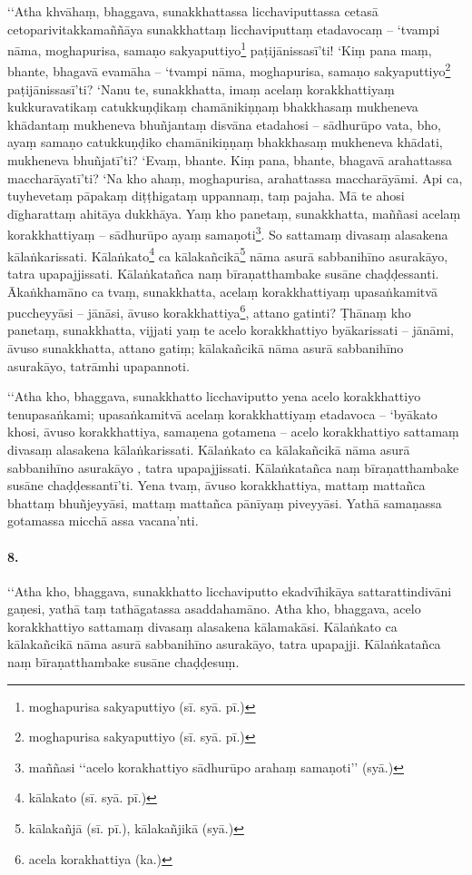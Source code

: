 ‘‘Atha khvāhaṃ, bhaggava, sunakkhattassa licchaviputtassa cetasā cetoparivitakkamaññāya sunakkhattaṃ licchaviputtaṃ etadavocaṃ – ‘tvampi nāma, moghapurisa, samaṇo sakyaputtiyo\footnote{moghapurisa sakyaputtiyo (sī. syā. pī.)} paṭijānissasī’ti! ‘Kiṃ pana maṃ, bhante, bhagavā evamāha – ‘tvampi nāma, moghapurisa, samaṇo sakyaputtiyo\footnote{moghapurisa sakyaputtiyo (sī. syā. pī.)} paṭijānissasī’ti? ‘Nanu te, sunakkhatta, imaṃ acelaṃ korakkhattiyaṃ kukkuravatikaṃ catukkuṇḍikaṃ chamānikiṇṇaṃ bhakkhasaṃ mukheneva khādantaṃ mukheneva bhuñjantaṃ disvāna etadahosi – sādhurūpo vata, bho, ayaṃ samaṇo catukkuṇḍiko chamānikiṇṇaṃ bhakkhasaṃ mukheneva khādati, mukheneva bhuñjatī’ti? ‘Evaṃ, bhante. Kiṃ pana, bhante, bhagavā arahattassa maccharāyatī’ti? ‘Na kho ahaṃ, moghapurisa, arahattassa maccharāyāmi. Api ca, tuyhevetaṃ pāpakaṃ diṭṭhigataṃ uppannaṃ, taṃ pajaha. Mā te ahosi dīgharattaṃ ahitāya dukkhāya. Yaṃ kho panetaṃ, sunakkhatta, maññasi acelaṃ korakkhattiyaṃ – sādhurūpo ayaṃ samaṇoti\footnote{maññasi ‘‘acelo korakhattiyo sādhurūpo arahaṃ samaṇoti’’ (syā.)}. So sattamaṃ divasaṃ alasakena kālaṅkarissati. Kālaṅkato\footnote{kālakato (sī. syā. pī.)} ca kālakañcikā\footnote{kālakañjā (sī. pī.), kālakañjikā (syā.)} nāma asurā sabbanihīno asurakāyo, tatra upapajjissati. Kālaṅkatañca naṃ bīraṇatthambake susāne chaḍḍessanti. Ākaṅkhamāno ca tvaṃ, sunakkhatta, acelaṃ korakkhattiyaṃ upasaṅkamitvā puccheyyāsi – jānāsi, āvuso korakkhattiya\footnote{acela korakhattiya (ka.)}, attano gatinti? Ṭhānaṃ kho panetaṃ, sunakkhatta, vijjati yaṃ te acelo korakkhattiyo byākarissati – jānāmi, āvuso sunakkhatta, attano gatiṃ; kālakañcikā nāma asurā sabbanihīno asurakāyo, tatrāmhi upapannoti.

‘‘Atha kho, bhaggava, sunakkhatto licchaviputto yena acelo korakkhattiyo tenupasaṅkami; upasaṅkamitvā acelaṃ korakkhattiyaṃ etadavoca – ‘byākato khosi, āvuso korakkhattiya, samaṇena gotamena – acelo korakkhattiyo sattamaṃ divasaṃ alasakena kālaṅkarissati. Kālaṅkato ca kālakañcikā nāma asurā sabbanihīno asurakāyo , tatra upapajjissati. Kālaṅkatañca naṃ bīraṇatthambake susāne chaḍḍessantī’ti. Yena tvaṃ, āvuso korakkhattiya, mattaṃ mattañca bhattaṃ bhuñjeyyāsi, mattaṃ mattañca pānīyaṃ piveyyāsi. Yathā samaṇassa gotamassa micchā assa vacana’nti.

\paragraph{8.} ‘‘Atha kho, bhaggava, sunakkhatto licchaviputto ekadvīhikāya sattarattindivāni gaṇesi, yathā taṃ tathāgatassa asaddahamāno. Atha kho, bhaggava, acelo korakkhattiyo sattamaṃ divasaṃ alasakena kālamakāsi. Kālaṅkato ca kālakañcikā nāma asurā sabbanihīno asurakāyo, tatra upapajji. Kālaṅkatañca naṃ bīraṇatthambake susāne chaḍḍesuṃ.

